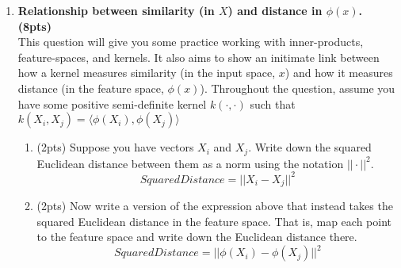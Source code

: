 \documentclass[11pt,english]{article}
\begin{document}
\begin{enumerate}
\begin{enumerate}
\begin{itemize}
\end{itemize}
\end{enumerate}

\item \textbf{Relationship between similarity (in $X$) and distance in $\phi(x)$. (8pts)} \\
This question will give you some practice working with inner-products, feature-spaces, and kernels. It also aims to show an initimate link between how a kernel measures similarity (in the input space, $x$) and how it measures distance (in the feature space, $\phi(x)$). Throughout the question, assume you have some positive semi-definite kernel $k(\cdot,\cdot)$ such that $k(X_i,X_j)=\langle \phi(X_i),\phi(X_j) \rangle$

\begin{enumerate}
\item (2pts) Suppose you have vectors $X_i$ and $X_j$. Write down the squared Euclidean distance between them as a norm using the notation $||\cdot||^2$.  \\
 $$Squared Distance =||X_i - X_j||^2$$


\item (2pts) Now write a version of the expression above that instead takes the squared Euclidean distance in the feature space. That is, map each point to the feature space and write down the Euclidean distance there.\\
$$Squared Distance =||\phi(X_i) - \phi(X_j)||^2$$


\end{enumerate}
\end{enumerate}
\end{document}

